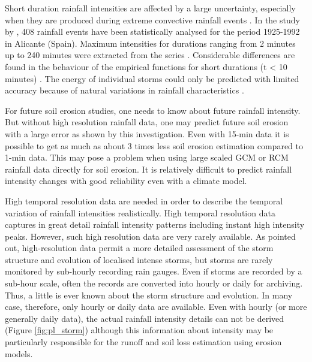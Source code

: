 Short duration rainfall intensities are affected by a large uncertainty,
especially when they are produced during extreme convective rainfall events
\citep{garcia2001-675}. In the study by \citet{garcia2001-675}, 408 rainfall
events have been statistically analysed for the period 1925-1992 in Alicante
(Spain). Maximum intensities for durations ranging from 2 minutes up to 240
minutes were extracted from the series \citep{garcia2001-675}. Considerable
differences are found in the behaviour of the empirical functions for short
durations (t < 10 minutes) \citep{garcia2001-675}. The energy of individual
storms could only be predicted with limited accuracy because of natural
variations in rainfall characteristics \citep{vandijk2002-1}.

For future soil erosion studies, one needs to know about future rainfall
intensity. But without high resolution rainfall data, one may predict future
soil erosion with a large error as shown by this investigation.  Even with
15-min data it is possible to get as much as about 3 times less soil erosion
estimation compared to 1-min data. This may pose a problem when using large
scaled GCM or RCM rainfall data directly for soil erosion. It is relatively
difficult to predict rainfall intensity changes with good reliability even with
a climate model.


High temporal resolution data are needed in order to describe the temporal
variation of rainfall intensities realistically. High temporal resolution data
captures in great detail rainfall intensity patterns including instant high
intensity peaks. However, such high resolution data are very rarely available.
As \citet{allott2002-73} pointed out, high-resolution data permit a more
detailed assessment of the storm structure and evolution of localised intense
storms, but storms are rarely monitored by sub-hourly recording rain gauges.
Even if storms are recorded by a sub-hour scale, often the records are
converted into hourly or daily for archiving. Thus, a little is ever known
about the storm structure and evolution. In many case, therefore, only hourly or
daily data are available. Even with hourly (or more generally daily data), the
actual rainfall intensity details can not be derived (Figure \ref{fig:pl_storm})
although this information about intensity may be particularly responsible for
the runoff and soil loss estimation using erosion models.

